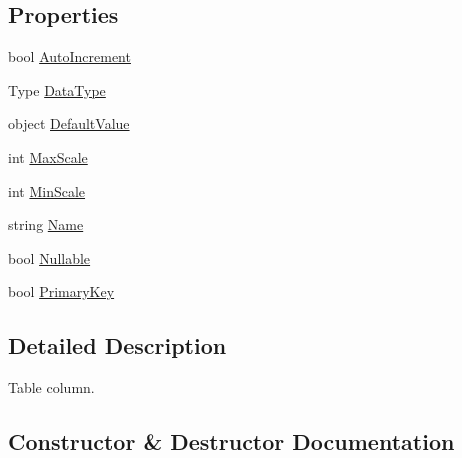 \subsection*{Properties}
\begin{DoxyCompactItemize}
\item 
bool \hyperlink{structOTA_1_1Data_1_1TableColumn_a3e6848fe3c66d4bac1f25c81f5f09c4a}{Auto\+Increment}
\item 
Type \hyperlink{structOTA_1_1Data_1_1TableColumn_a092b2f4b949296fe9de388cd73ad28d2}{Data\+Type}
\item 
object \hyperlink{structOTA_1_1Data_1_1TableColumn_a3c4b8d9857ae994173b951f8c7dc7a22}{Default\+Value}
\item 
int \hyperlink{structOTA_1_1Data_1_1TableColumn_afda5a1aff9c96d4ec0b4b1f683879419}{Max\+Scale}
\item 
int \hyperlink{structOTA_1_1Data_1_1TableColumn_a9d1f669fbac0a5926f8ee82e8eb4dd49}{Min\+Scale}
\item 
string \hyperlink{structOTA_1_1Data_1_1TableColumn_a7ee9065718e6628dc7791b756fa6c0f9}{Name}
\item 
bool \hyperlink{structOTA_1_1Data_1_1TableColumn_a97e2e8ae43d025c97f3b344449cbd4dd}{Nullable}
\item 
bool \hyperlink{structOTA_1_1Data_1_1TableColumn_a75d37c9ec186c55dbc7f55fbc45ffec9}{Primary\+Key}
\end{DoxyCompactItemize}


\subsection{Detailed Description}
Table column. 



\subsection{Constructor \& Destructor Documentation}
\hypertarget{structOTA_1_1Data_1_1TableColumn_addc926f8204ea0984eee566293e37cad}{}
